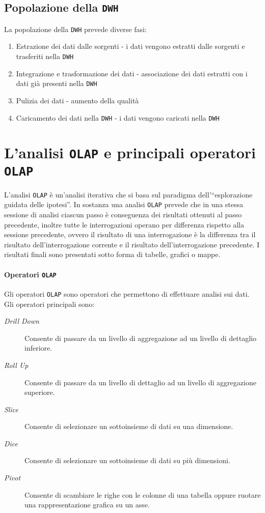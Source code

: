     \subsection{Popolazione della \texttt{DWH}}
        La popolazione della \texttt{DWH} prevede diverse fasi:
        \begin{enumerate}
            \item Estrazione dei dati dalle sorgenti - i dati vengono estratti dalle sorgenti e trasferiti nella \texttt{DWH}
            \item Integrazione e trasformazione dei dati - associazione dei dati estratti con i dati già presenti nella \texttt{DWH}
            \item Pulizia dei dati - aumento della qualità
            \item Caricamento dei dati nella \texttt{DWH} - i dati vengono caricati nella \texttt{DWH}
        \end{enumerate}
\section{L'analisi \texttt{OLAP} e principali operatori \texttt{OLAP}}
    L'analisi \texttt{OLAP} è un'analisi iterativa che si basa sul paradigma dell'``esplorazione guidata delle ipotesi''. In sostanza una analisi \texttt{OLAP} prevede che in una stessa sessione di analisi ciascun passo è conseguenza dei risultati ottenuti al passo precedente, inoltre tutte le interrogazioni operano per differenza rispetto alla sessione precedente, ovvero il risultato di una interrogazione è la differenza tra il risultato dell'interrogazione corrente e il risultato dell'interrogazione precedente. I risultati finali sono presentati sotto forma di tabelle, grafici o mappe.
    \paragraph{Operatori \texttt{OLAP}}
    Gli operatori \texttt{OLAP} sono operatori che permettono di effettuare analisi sui dati. Gli operatori principali sono:
    \begin{description}
        \item[\textit{Drill Down}] Consente di passare da un livello di aggregazione ad un livello di dettaglio inferiore.
        \item[\textit{Roll Up}] Consente di passare da un livello di dettaglio ad un livello di aggregazione superiore.
        \item[\textit{Slice}] Consente di selezionare un sottoinsieme di dati su una dimensione.
        \item[\textit{Dice}] Consente di selezionare un sottoinsieme di dati su più dimensioni.
        \item[\textit{Pivot}] Consente di scambiare le righe con le colonne di una tabella oppure ruotare una rappresentazione grafica su un asse.
    \end{description}

